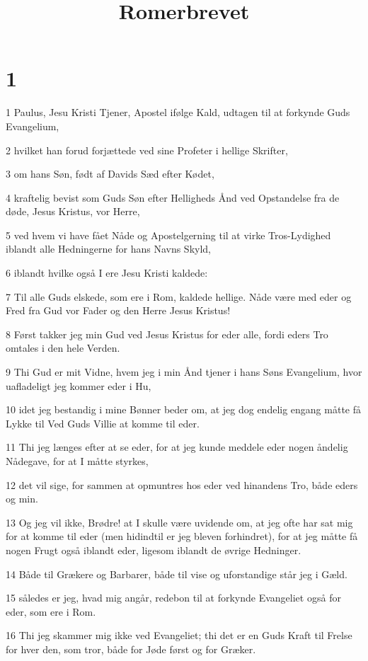 

\title{Romerbrevet}


\chapter{1}

\par 1 Paulus, Jesu Kristi Tjener, Apostel ifølge Kald, udtagen til at forkynde Guds Evangelium,
\par 2 hvilket han forud forjættede ved sine Profeter i hellige Skrifter,
\par 3 om hans Søn, født af Davids Sæd efter Kødet,
\par 4 kraftelig bevist som Guds Søn efter Helligheds Ånd ved Opstandelse fra de døde, Jesus Kristus, vor Herre,
\par 5 ved hvem vi have fået Nåde og Apostelgerning til at virke Tros-Lydighed iblandt alle Hedningerne for hans Navns Skyld,
\par 6 iblandt hvilke også I ere Jesu Kristi kaldede:
\par 7 Til alle Guds elskede, som ere i Rom, kaldede hellige. Nåde være med eder og Fred fra Gud vor Fader og den Herre Jesus Kristus!
\par 8 Først takker jeg min Gud ved Jesus Kristus for eder alle, fordi eders Tro omtales i den hele Verden.
\par 9 Thi Gud er mit Vidne, hvem jeg i min Ånd tjener i hans Søns Evangelium, hvor uafladeligt jeg kommer eder i Hu,
\par 10 idet jeg bestandig i mine Bønner beder om, at jeg dog endelig engang måtte få Lykke til Ved Guds Villie at komme til eder.
\par 11 Thi jeg længes efter at se eder, for at jeg kunde meddele eder nogen åndelig Nådegave, for at I måtte styrkes,
\par 12 det vil sige, for sammen at opmuntres hos eder ved hinandens Tro, både eders og min.
\par 13 Og jeg vil ikke, Brødre! at I skulle være uvidende om, at jeg ofte har sat mig for at komme til eder (men hidindtil er jeg bleven forhindret), for at jeg måtte få nogen Frugt også iblandt eder, ligesom iblandt de øvrige Hedninger.
\par 14 Både til Grækere og Barbarer, både til vise og uforstandige står jeg i Gæld.
\par 15 således er jeg, hvad mig angår, redebon til at forkynde Evangeliet også for eder, som ere i Rom.
\par 16 Thi jeg skammer mig ikke ved Evangeliet; thi det er en Guds Kraft til Frelse for hver den, som tror, både for Jøde først og for Græker.
